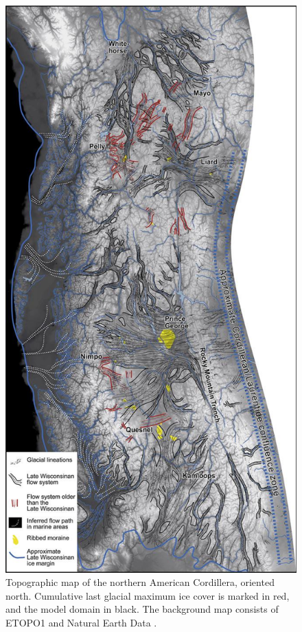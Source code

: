 \documentclass[a4paper]{kappa}
\begin{document}
\begin{figure}
  \includegraphics{map-cordillera}
  \caption{Topographic map of the northern American Cordillera, oriented north.
           Cumulative last glacial maximum ice cover \citep{Dyke.2004} is
           marked in red, and the model domain in black.
           The background map consists of ETOPO1 \citep{Amante.Eakins.2009}
           and Natural Earth Data \citep{Patterson.Kelso.2014}.}
  \label{fig:map-cordillera}
\end{figure}
\end{document}
